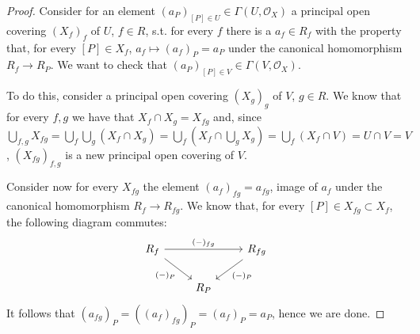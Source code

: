 \documentclass{article}
\newcommand{\exercise}[1]{\noindent {\bf Exercise #1}}
\begin{document}
\begin{proof}
    Consider for an element $(a_P)_{[P]\in U}\in\Gamma(U,\mathcal{O}_X)$ a
    principal open covering $(X_f)_f$ of $U$, $f\in R$, s.t. for every $f$ there
    is a $a_f\in R_f$ with the property that, for every $[P]\in X_f$,
    $a_f\mapsto (a_f)_P=a_P$ under the canonical homomorphism $R_f\rightarrow
    R_P$. We want to check that $(a_P)_{[P]\in V}\in\Gamma(V,\mathcal{O}_X)$.

    To do this, consider a principal open covering $(X_g)_g$ of $V$, $g\in R$.
    We know that for every $f,g$ we have that $X_f\cap X_g=X_{fg}$ and, since
    $\bigcup_{f,g} X_{fg}=\bigcup_f\bigcup_g (X_f\cap X_g)=\bigcup_f
    (X_f\cap\bigcup_g X_g)=\bigcup_f (X_f\cap V)=U\cap V=V$, $(X_{fg})_{f,g}$ is
    a new principal open covering of $V$.
    
    Consider now for every $X_{fg}$ the element $(a_f)_{fg}=a_{fg}$, image of $a_f$
    under the canonical homomorphism $R_f\rightarrow R_{fg}$. We know that, for
    every $[P]\in X_{fg}\subset X_f$, the following diagram commutes:
    \[
        \begin{tikzcd}
            R_f\arrow{rr}{(-)_{fg}}\arrow[swap]{dr}{(-)_P}
            && R_{fg}\arrow{dl}{(-)_P} \\
            & R_P
        \end{tikzcd}
    \]
    It follows that $(a_{fg})_P=((a_f)_{fg})_P=(a_f)_P=a_P$, hence we are done.
\end{proof}


~\\
\exercise{3}
\end{document}
